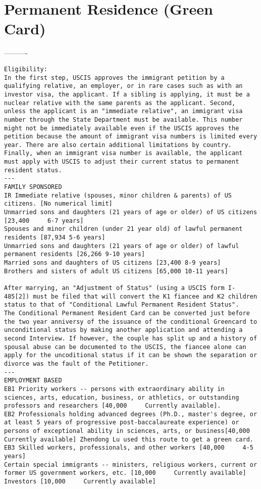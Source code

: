 \documentclass[oneside, article]{memoir}
\begin{document}
\section{Permanent Residence (Green Card)}
----------
\begin{verbatim}
Eligibility:
In the first step, USCIS approves the immigrant petition by a qualifying relative, an employer, or in rare cases such as with an investor visa, the applicant. If a sibling is applying, it must be a nuclear relative with the same parents as the applicant. Second, unless the applicant is an "immediate relative", an immigrant visa number through the State Department must be available. This number might not be immediately available even if the USCIS approves the petition because the amount of immigrant visa numbers is limited every year. There are also certain additional limitations by country. Finally, when an immigrant visa number is available, the applicant must apply with USCIS to adjust their current status to permanent resident status.
---
FAMILY SPONSORED
IR Immediate relative (spouses, minor children & parents) of US citizens. [No numerical limit]
Unmarried sons and daughters (21 years of age or older) of US citizens [23,400     6-7 years]
Spouses and minor children (under 21 year old) of lawful permanent residents [87,934 5-6 years]
Unmarried sons and daughters (21 years of age or older) of lawful permanent residents [26,266 9-10 years]
Married sons and daughters of US citizens [23,400 8-9 years]
Brothers and sisters of adult US citizens [65,000 10-11 years]

After marrying, an "Adjustment of Status" (using a USCIS form I-485[2]) must be filed that will convert the K1 fiancee and K2 children status to that of "Conditional Lawful Permanent Resident Status".
The Conditional Permanent Resident Card can be converted just before the two year anniversy of the issuance of the conditional Greencard to unconditional status by making another application and attending a second Interview. If however, the couple has split up and a history of spousal abuse can be documented to the USCIS, the fiancee alone can apply for the uncoditional status if it can be shown the separation or divorce was the fault of the Petitioner.
---
EMPLOYMENT BASED
EB1 Priority workers -- persons with extraordinary ability in sciences, arts, education, business, or athletics, or outstanding professors and researchers [40,000     Currently available].
EB2 Professionals holding advanced degrees (Ph.D., master's degree, or at least 5 years of progressive post-baccalaureate experience) or persons of exceptional ability in sciences, arts, or business[40,000     Currently available] Zhendong Lu used this route to get a green card.
EB3 Skilled workers, professionals, and other workers [40,000     4-5 years]
Certain special immigrants -- ministers, religious workers, current or former US government workers, etc. [10,000     Currently available]
Investors [10,000     Currently available]


\end{verbatim}
\end{document}

